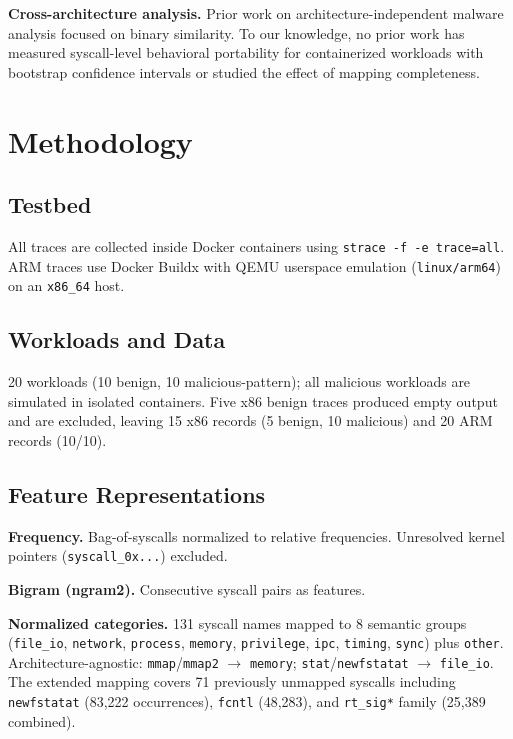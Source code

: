 \documentclass[10pt,twocolumn]{article}
\begin{document}
\textbf{Cross-architecture analysis.}
Prior work on architecture-independent malware analysis focused on binary
similarity. To our knowledge, no prior work has measured syscall-level
behavioral portability for containerized workloads with bootstrap confidence
intervals or studied the effect of mapping completeness.

\section{Methodology}

\subsection{Testbed}

All traces are collected inside Docker containers using
\texttt{strace -f -e trace=all}. ARM traces use Docker Buildx with QEMU
userspace emulation (\texttt{linux/arm64}) on an \texttt{x86\_64} host.

\subsection{Workloads and Data}

20 workloads (10 benign, 10 malicious-pattern); all malicious workloads are
simulated in isolated containers. Five x86 benign traces produced empty output
and are excluded, leaving 15 x86 records (5 benign, 10 malicious) and 20 ARM
records (10/10).

\subsection{Feature Representations}

\textbf{Frequency.} Bag-of-syscalls normalized to relative frequencies.
Unresolved kernel pointers (\texttt{syscall\_0x...}) excluded.

\textbf{Bigram (ngram2).} Consecutive syscall pairs as features.

\textbf{Normalized categories.} 131 syscall names mapped to 8 semantic groups
(\texttt{file\_io}, \texttt{network}, \texttt{process}, \texttt{memory},
\texttt{privilege}, \texttt{ipc}, \texttt{timing}, \texttt{sync}) plus
\texttt{other}. Architecture-agnostic: \texttt{mmap}/\texttt{mmap2}
$\to$ \texttt{memory}; \texttt{stat}/\texttt{newfstatat}
$\to$ \texttt{file\_io}. The extended mapping covers 71 previously unmapped
syscalls including \texttt{newfstatat} (83,222 occurrences),
\texttt{fcntl} (48,283), and \texttt{rt\_sig*} family (25,389 combined).
\end{document}
